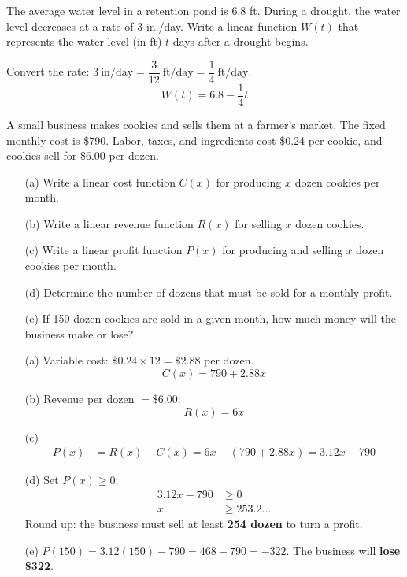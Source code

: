 \documentclass{ximera}
\begin{document}
\begin{problem}
The average water level in a retention pond is 6.8 ft. During a drought, the water level decreases at a rate of 3 in./day. Write a linear function $W(t)$ that represents the water level (in ft) $t$ days after a drought begins.

\begin{solution}
Convert the rate: $3\ \text{in/day} = \dfrac{3}{12}\ \text{ft/day} = \dfrac{1}{4}\ \text{ft/day}$.
$$W(t) = 6.8 - \frac{1}{4}t$$
\end{solution}
\end{problem}


\begin{problem}
A small business makes cookies and sells them at a farmer's market. The fixed monthly cost is \$790. Labor, taxes, and ingredients cost \$0.24 per cookie, and cookies sell for \$6.00 per dozen.
\begin{enumerate}
  \item[(a)] Write a linear cost function $C(x)$ for producing $x$ dozen cookies per month.
  \medskip
  \item[(b)] Write a linear revenue function $R(x)$ for selling $x$ dozen cookies.
  \medskip
  \item[(c)] Write a linear profit function $P(x)$ for producing and selling $x$ dozen cookies per month.
  \medskip
  \item[(d)] Determine the number of dozens that must be sold for a monthly profit.
  \medskip
  \item[(e)] If 150 dozen cookies are sold in a given month, how much money will the business make or lose?
\end{enumerate}

\begin{solution}
\begin{enumerate}
  \item[(a)] Variable cost: $\$0.24 \times 12 = \$2.88$ per dozen.
  $$C(x) = 790 + 2.88x$$

  \item[(b)] Revenue per dozen $= \$6.00$:
  $$R(x) = 6x$$

  \item[(c)]
  \begin{align*}
    P(x) &= R(x) - C(x) = 6x - (790 + 2.88x) = 3.12x - 790
  \end{align*}

  \item[(d)] Set $P(x) \geq 0$:
  \begin{align*}
    3.12x - 790 &\geq 0\\
    x &\geq 253.2\ldots
  \end{align*}
  Round up: the business must sell at least \textbf{254 dozen} to turn a profit.

  \item[(e)] $P(150) = 3.12(150) - 790 = 468 - 790 = -322$. The business will \textbf{lose \$322}.
\end{enumerate}
\end{solution}
\end{problem}
\end{document}
